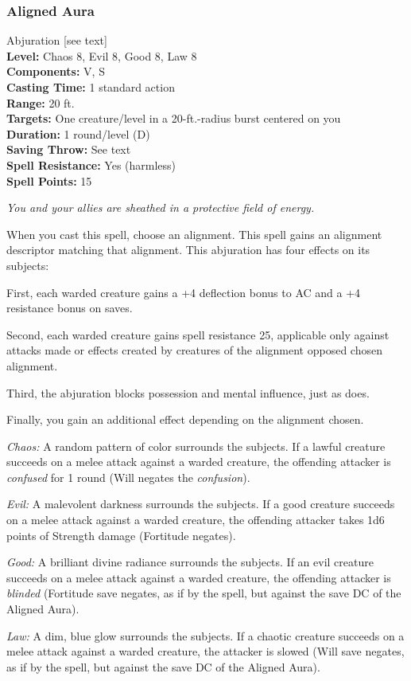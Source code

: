 \subsubsection{Aligned Aura}
\label{Spell:AlignedAura}
Abjuration [see text]
\\ \textbf{Level:} Chaos 8, Evil 8, Good 8, Law 8
\\ \textbf{Components:} V, S
\\ \textbf{Casting Time:} 1 standard action
\\ \textbf{Range:} 20 ft.
\\ \textbf{Targets:} One creature/level in a 20-ft.-radius burst centered on you
\\ \textbf{Duration:} 1 round/level (D)
\\ \textbf{Saving Throw:} See text
\\ \textbf{Spell Resistance:} Yes (harmless)
\\ \textbf{Spell Points:} 15

\emph{You and your allies are sheathed in a protective field of energy.}

When you cast this spell, choose an alignment. This spell gains an alignment descriptor matching that alignment.
This abjuration has four effects on its subjects:

First, each warded creature gains a +4 deflection bonus to AC and a +4 resistance bonus on saves. 

Second, each warded creature gains spell resistance 25, applicable only against attacks made or effects created by creatures of the alignment opposed chosen alignment.

Third, the abjuration blocks possession and mental influence, just as  does.

Finally, you gain an additional effect depending on the alignment chosen.
\begin{list}{}{\leftmargin=1em}
 \item \emph{Chaos:} A random pattern of color surrounds the subjects.
If a lawful creature succeeds on a melee attack against a warded creature, 
the offending attacker is \emph{confused} for 1 round (Will negates the \emph{confusion}).
 \item \emph{Evil:} A malevolent darkness surrounds the subjects.
If a good creature succeeds on a melee attack against a warded creature, 
the offending attacker takes 1d6 points of Strength damage (Fortitude negates).
 \item \emph{Good:} A brilliant divine radiance surrounds the subjects. 
If an evil creature succeeds on a melee attack against a warded creature, 
the offending attacker is \emph{blinded} (Fortitude save negates, as if by the  spell, but against the save DC of the Aligned Aura).
 \item \emph{Law:} A dim, blue glow surrounds the subjects.
If a chaotic creature succeeds on a melee attack against a warded creature, 
the attacker is slowed (Will save negates, as if by the  spell, but against the save DC of the Aligned Aura).
\end{list}
